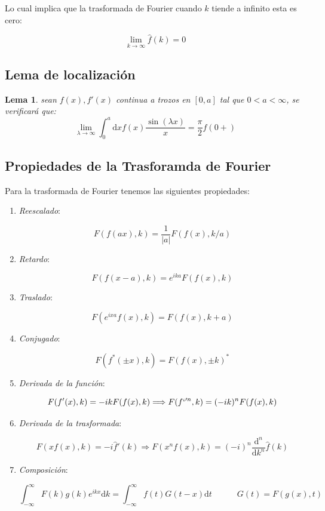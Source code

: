 \documentclass[12pt,a4paper]{book}
\newcommand{\D}{\mathrm{d}}
\newcommand{\inti}{\int_{-\infty}^{\infty}}
\newcommand{\hatf}{\widehat{f}}
\newcommand{\tquad}{\quad  \quad \quad}
\newtheorem{lemma}{Lema}[section]
\begin{document}
Lo cual implica que la trasformada de Fourier cuando $k$ tiende a infinito esta es cero:

\begin{equation}
 \lim_{k \rightarrow \infty} \hatf (k) = 0 
\end{equation}

\subsection{Lema de localización}

\begin{lemma}
sean $f(x), f'(x)$ continua a trozos en $[0,a]$ tal que $0<a<\infty$, se verificará que:
$$ \lim_{\lambda  \rightarrow \infty} \int_ 0^a \D x f(x) \dfrac{\sin (\lambda x)}{x} = \dfrac{\pi}{2} f(0+) $$
\end{lemma}


\subsection{Propiedades de la Trasforamda de Fourier}

Para la trasformada de Fourier tenemos las siguientes propiedades:

\begin{enumerate}

\item \textit{Reescalado}:

$$ F(f(ax),k) = \dfrac{1}{|a|} F(f(x),k/a) $$

\item \textit{Retardo}:

$$ F(f(x-a),k) = e^{ika} F(f(x),k) $$

\item \textit{Traslado}:

$$ F(e^{ixa} f(x),k) = F(f(x),k+a) $$

\item \textit{Conjugado}:

$$ F(f^* (\pm x), k) = F(f(x), \pm k)^* $$

\item \textit{Derivada de la función}:

$$ F(f'(x),k) = - ik F(f(x),k)  \Longrightarrow F(f`'^{n},k) = (-ik)^n F(f(x),k) $$

\item \textit{Derivada de la trasformada}:

$$ F(x f(x), k) = -i \hatf'(k) \Longrightarrow F(x^n f(x), k) = (-i)^n \dfrac{\D^n}{\D k^n} \hatf (k) $$

\item \textit{Composición}:

$$ \inti F(k) g(k) e^{ikx} \D k = \inti f(t) G(t-x) \D t \tquad G(t) = F(g(x),t) $$

\end{enumerate}
\end{document}
